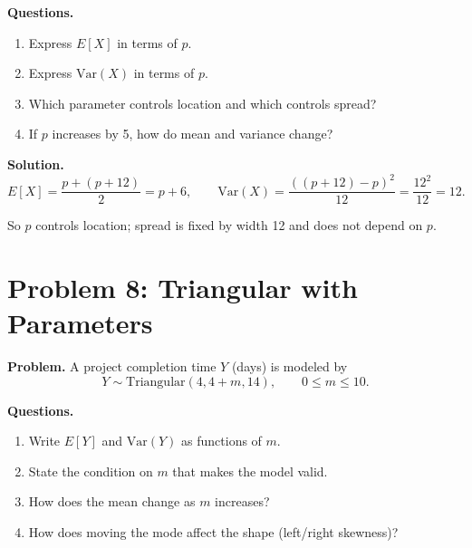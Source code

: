 \textbf{Questions.}
\begin{enumerate}
  \item Express \(E[X]\) in terms of \(p\).
  \item Express \(\mathrm{Var}(X)\) in terms of \(p\).
  \item Which parameter controls location and which controls spread?
  \item If \(p\) increases by 5, how do mean and variance change?
\end{enumerate}

\textbf{Solution.}
\[
E[X]=\frac{p+(p+12)}{2}=p+6,
\qquad
\mathrm{Var}(X)=\frac{((p+12)-p)^2}{12}=\frac{12^2}{12}=12.
\]
\begin{center}
\end{center}
So \(p\) controls location; spread is fixed by width 12 and does not depend on \(p\).

\section{Problem 8: Triangular with Parameters}

\textbf{Problem.}
A project completion time \(Y\) (days) is modeled by
\[
Y\sim \text{Triangular}(4,4+m,14),\qquad 0\le m\le 10.
\]

\textbf{Questions.}
\begin{enumerate}
  \item Write \(E[Y]\) and \(\mathrm{Var}(Y)\) as functions of \(m\).
  \item State the condition on \(m\) that makes the model valid.
  \item How does the mean change as \(m\) increases?
  \item How does moving the mode affect the shape (left/right skewness)?
\end{enumerate}

